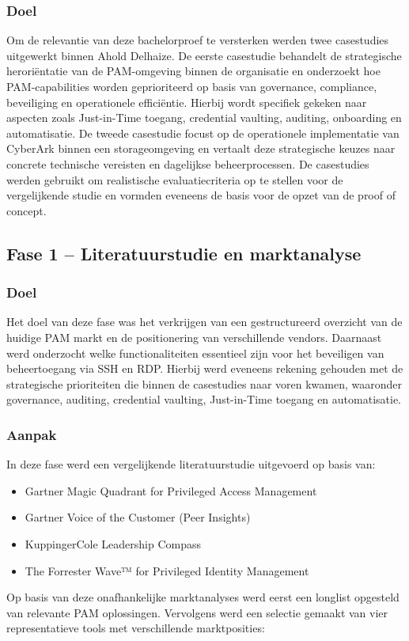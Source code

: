 \subsubsection{Doel}
Om de relevantie van deze bachelorproef te versterken werden twee casestudies uitgewerkt binnen Ahold Delhaize. De eerste casestudie behandelt de strategische heroriëntatie van de PAM-omgeving binnen de organisatie en onderzoekt hoe PAM-capabilities worden geprioriteerd op basis van governance, compliance, beveiliging en operationele efficiëntie. Hierbij wordt specifiek gekeken naar aspecten zoals Just-in-Time toegang, credential vaulting, auditing, onboarding en automatisatie.
De tweede casestudie focust op de operationele implementatie van CyberArk binnen een storageomgeving en vertaalt deze strategische keuzes naar concrete technische vereisten en dagelijkse beheerprocessen.
De casestudies werden gebruikt om realistische evaluatiecriteria op te stellen voor de vergelijkende studie en vormden eveneens de basis voor de opzet van de proof of concept.


\subsection{Fase 1 – Literatuurstudie en marktanalyse}
\subsubsection{Doel}
Het doel van deze fase was het verkrijgen van een gestructureerd overzicht van de huidige PAM markt en de positionering van verschillende vendors. Daarnaast werd onderzocht welke functionaliteiten essentieel zijn voor het beveiligen van beheertoegang via SSH en RDP. Hierbij werd eveneens rekening gehouden met de strategische prioriteiten die binnen de casestudies naar voren kwamen, waaronder governance, auditing, credential vaulting, Just-in-Time toegang en automatisatie.
\subsubsection{Aanpak}
In deze fase werd een vergelijkende literatuurstudie uitgevoerd op basis van:
\begin{itemize}
	\item Gartner Magic Quadrant for Privileged Access Management
	\item Gartner Voice of the Customer (Peer Insights)
	\item KuppingerCole Leadership Compass
	\item The Forrester Wave™ for Privileged Identity Management
\end{itemize}
Op basis van deze onafhankelijke marktanalyses werd eerst een longlist opgesteld van relevante PAM oplossingen. Vervolgens werd een selectie gemaakt van vier representatieve tools met verschillende marktposities:

